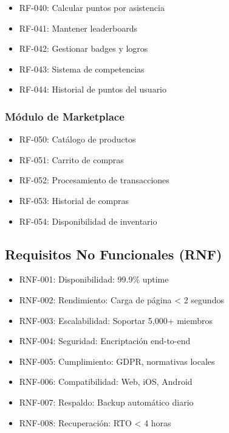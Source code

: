 \documentclass[11pt,a4paper]{article}
\begin{document}
\begin{itemize}
\begin{itemize}
    \item RF-040: Calcular puntos por asistencia
    \item RF-041: Mantener leaderboards
    \item RF-042: Gestionar badges y logros
    \item RF-043: Sistema de competencias
    \item RF-044: Historial de puntos del usuario
\end{itemize}

\subsubsection{Módulo de Marketplace}

\begin{itemize}
    \item RF-050: Catálogo de productos
    \item RF-051: Carrito de compras
    \item RF-052: Procesamiento de transacciones
    \item RF-053: Historial de compras
    \item RF-054: Disponibilidad de inventario
\end{itemize}

\subsection{Requisitos No Funcionales (RNF)}

\begin{itemize}
    \item RNF-001: Disponibilidad: 99.9\% uptime
    \item RNF-002: Rendimiento: Carga de página < 2 segundos
    \item RNF-003: Escalabilidad: Soportar 5,000+ miembros
    \item RNF-004: Seguridad: Encriptación end-to-end
    \item RNF-005: Cumplimiento: GDPR, normativas locales
    \item RNF-006: Compatibilidad: Web, iOS, Android
    \item RNF-007: Respaldo: Backup automático diario
    \item RNF-008: Recuperación: RTO < 4 horas
\end{itemize}


\end{itemize}
\end{document}

